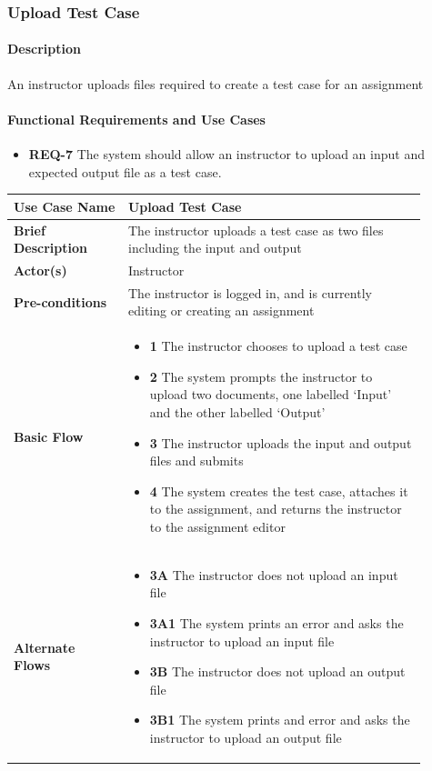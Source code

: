 \documentclass{article}
\begin{document}
\subsubsection{Upload Test Case}

\paragraph{Description} An instructor uploads files required to create a test case for an assignment

\paragraph{Functional Requirements and Use Cases}

\begin{itemize}
  \item \textbf{REQ-7} The system should allow an instructor to upload an input and expected output file as a test case.
\end{itemize}

\vspace{0.2in}
\begin{tabular}{| p{0.25\linewidth} | p{0.65\linewidth} |}
  \hline
  \textbf{Use Case Name} & Upload Test Case \\
  \hline
  \textbf{Brief Description} & The instructor uploads a test case as two files including the input and output \\
  \hline
  \textbf{Actor(s)} & Instructor \\
  \hline
  \textbf{Pre-conditions} & The instructor is logged in, and is currently editing or creating an assignment\\
  \hline
  \textbf{Basic Flow} & \begin{itemize}
    \item[] \textbf{1} The instructor chooses to upload a test case
    \item[] \textbf{2} The system prompts the instructor to upload two documents, one labelled `Input' and the other labelled `Output'
    \item[] \textbf{3} The instructor uploads the input and output files and submits
    \item[] \textbf{4} The system creates the test case, attaches it to the assignment, and returns the instructor to the assignment editor
  \end{itemize}\\
  \hline
  \textbf{Alternate Flows} & \begin{itemize}
    \item[] \textbf{3A} The instructor does not upload an input file
    \item[] \textbf{3A1} The system prints an error and asks the instructor to upload an input file
    \item[] \textbf{3B} The instructor does not upload an output file
    \item[] \textbf{3B1} The system prints and error and asks the instructor to upload an output file
  \end{itemize} \\
  \hline
\end{tabular}
\end{document}
